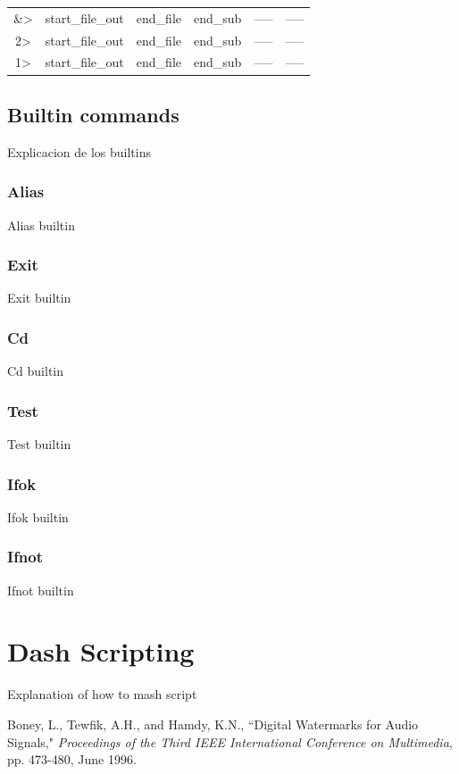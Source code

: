 \documentclass[12pt,a4paper]{report}
\begin{document}
\begin{table}[H]
\begin{tabular}{ |c|c|c|c|c|c| }
	\&>  & start\_file\_out \cellcolor[HTML]{BEE9F9}& end\_file \cellcolor[HTML]{BEE9F9}&  end\_sub \cellcolor[HTML]{FFF49C}& ----- & ----- \\
	2>  & start\_file\_out \cellcolor[HTML]{BEE9F9}& end\_file \cellcolor[HTML]{BEE9F9}&  end\_sub \cellcolor[HTML]{FFF49C}& ----- & ----- \\
	1>  & start\_file\_out \cellcolor[HTML]{BEE9F9}& end\_file \cellcolor[HTML]{BEE9F9}&  end\_sub \cellcolor[HTML]{FFF49C}& ----- & ----- \\
	\hline
\end{tabular}
\end{table}
\chapter{Builtin commands}
Explicacion de los builtins
\section{Alias}
Alias builtin
\section{Exit}
Exit builtin
\section{Cd}
Cd builtin
\section{Test}
Test builtin
\section{Ifok}
Ifok builtin
\section{Ifnot}
Ifnot builtin
\part{Dash Scripting}
Explanation of how to mash script
\begin{thebibliography}{100} %
	 Boney, L., Tewfik, A.H., and Hamdy, K.N., ``Digital
	Watermarks for Audio Signals," \emph{Proceedings of the Third IEEE
		International Conference on Multimedia}, pp. 473-480, June 1996.
\end{thebibliography}
\end{document}
